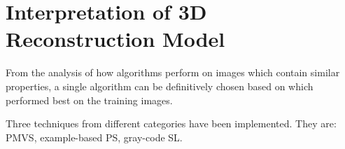 
\chapter{Interpretation of 3D Reconstruction Model}
\label{ch:3DRecon_Interp}

From the analysis of how algorithms perform on images which contain similar properties, a single algorithm can be definitively chosen based on which performed best on the training images.

Three techniques from different categories have been implemented. They are: PMVS, example-based PS, gray-code SL.